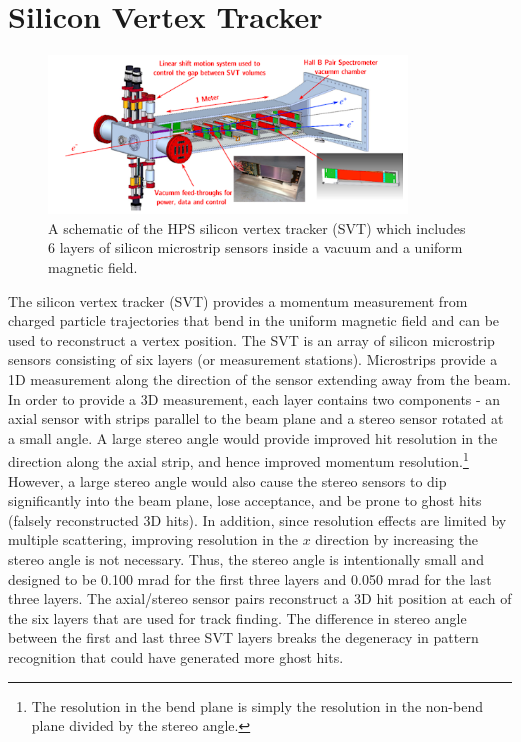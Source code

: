 \clearpage

\section{Silicon Vertex Tracker}\label{sec:svt}

\begin{figure}
    \centering
    \includegraphics[width=0.85\textwidth]{figs/detector/svt.png}
    \caption{A schematic of the HPS silicon vertex tracker (SVT) which includes 6 layers of silicon microstrip sensors inside a vacuum and a uniform magnetic field.}
    \label{fig:svt}
\end{figure}

The silicon vertex tracker (SVT) provides a momentum measurement from charged particle trajectories that bend in the uniform magnetic field and can be used to reconstruct a vertex position. The SVT is an array of silicon microstrip sensors consisting of six layers (or measurement stations). Microstrips provide a 1D measurement along the direction of the sensor extending away from the beam. In order to provide a 3D measurement, each layer contains two components - an axial sensor with strips parallel to the beam plane and a stereo sensor rotated at a small angle. A large stereo angle would provide improved hit resolution in the direction along the axial strip, and hence improved momentum resolution.\footnote{The resolution in the bend plane is simply the resolution in the non-bend plane divided by the stereo angle.} However, a large stereo angle would also cause the stereo sensors to dip significantly into the beam plane, lose acceptance, and be prone to ghost hits (falsely reconstructed 3D hits). In addition, since resolution effects are limited by multiple scattering, improving resolution in the $x$ direction by increasing the stereo angle is not necessary. Thus, the stereo angle is intentionally small and designed to be 0.100 mrad for the first three layers and 0.050 mrad for the last three layers. The axial/stereo sensor pairs reconstruct a 3D hit position at each of the six layers that are used for track finding. The difference in stereo angle between the first and last three SVT layers breaks the degeneracy in pattern recognition that could have generated more ghost hits. %

